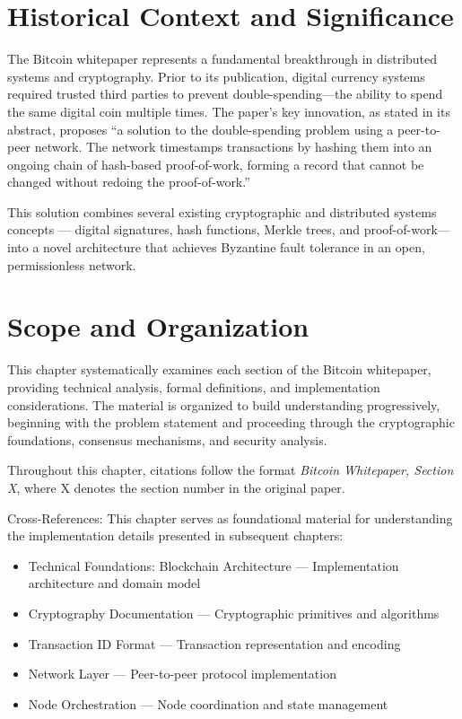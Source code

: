 \section{Historical Context and Significance}
\label{sec:historical-context}

The Bitcoin whitepaper represents a fundamental breakthrough in distributed systems and cryptography. Prior to its publication, digital currency systems required trusted third parties to prevent double-spending---the ability to spend the same digital coin multiple times. The paper's key innovation, as stated in its abstract, proposes ``a solution to the double-spending problem using a peer-to-peer network. The network timestamps transactions by hashing them into an ongoing chain of hash-based proof-of-work, forming a record that cannot be changed without redoing the proof-of-work.''

This solution combines several existing cryptographic and distributed systems concepts --- digital signatures, hash functions, Merkle trees, and proof-of-work---into a novel architecture that achieves Byzantine fault tolerance in an open, permissionless network.

\section{Scope and Organization}
\label{sec:scope-organization}

This chapter systematically examines each section of the Bitcoin whitepaper, providing technical analysis, formal definitions, and implementation considerations. The material is organized to build understanding progressively, beginning with the problem statement and proceeding through the cryptographic foundations, consensus mechanisms, and security analysis.

Throughout this chapter, citations follow the format \emph{Bitcoin Whitepaper, Section X}, where X denotes the section number in the original paper.

\begin{notebox}
Cross-References: This chapter serves as foundational material for understanding the implementation details presented in subsequent chapters:
\begin{itemize}
  \item Technical Foundations: Blockchain Architecture --- Implementation architecture and domain model
  \item Cryptography Documentation --- Cryptographic primitives and algorithms
  \item Transaction ID Format --- Transaction representation and encoding
  \item Network Layer --- Peer-to-peer protocol implementation
  \item Node Orchestration --- Node coordination and state management
\end{itemize}
\end{notebox}

